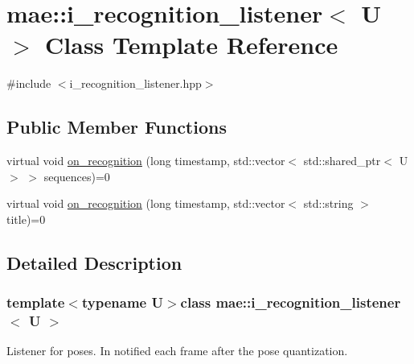 \hypertarget{classmae_1_1i__recognition__listener}{\section{mae\-:\-:i\-\_\-recognition\-\_\-listener$<$ U $>$ Class Template Reference}
\label{classmae_1_1i__recognition__listener}
}


{\ttfamily \#include $<$i\-\_\-recognition\-\_\-listener.\-hpp$>$}

\subsection*{Public Member Functions}
\begin{DoxyCompactItemize}
\item 
virtual void \hyperlink{classmae_1_1i__recognition__listener_af243ddd9d09c2c8a27685a52b5e24da5}{on\-\_\-recognition} (long timestamp, std\-::vector$<$ std\-::shared\-\_\-ptr$<$ U $>$ $>$ sequences)=0
\item 
virtual void \hyperlink{classmae_1_1i__recognition__listener_a067c7e2b46f408c270c5cf6d81fe1317}{on\-\_\-recognition} (long timestamp, std\-::vector$<$ std\-::string $>$ title)=0
\end{DoxyCompactItemize}


\subsection{Detailed Description}
\subsubsection*{template$<$typename U$>$class mae\-::i\-\_\-recognition\-\_\-listener$<$ U $>$}

Listener for poses. In notified each frame after the pose quantization. 

